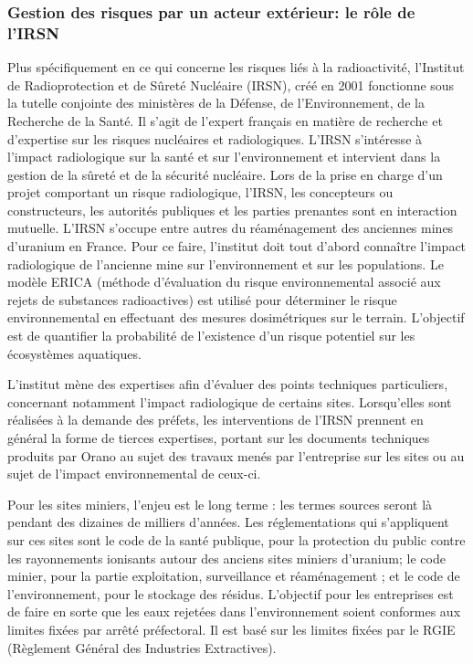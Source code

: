 \documentclass{article}
\begin{document}
\subsubsection{Gestion des risques par un acteur extérieur: le rôle de l’IRSN}

Plus spécifiquement en ce qui concerne les risques liés à la radioactivité, l'Institut de Radioprotection et de Sûreté Nucléaire (IRSN), créé en 2001 fonctionne sous la tutelle conjointe des ministères de la Défense, de l’Environnement, de la Recherche de la Santé. Il s’agit de l’expert français en matière de recherche et d’expertise sur les risques nucléaires et radiologiques. L’IRSN s’intéresse à l’impact radiologique sur la santé et sur l'environnement et intervient dans la gestion de la sûreté et de la sécurité nucléaire. Lors de la prise en charge d’un projet comportant un risque radiologique, l’IRSN, les concepteurs ou constructeurs, les autorités publiques et les parties prenantes sont en interaction mutuelle. L’IRSN s’occupe entre autres du réaménagement des anciennes mines d’uranium en France. Pour ce faire, l’institut doit tout d’abord connaître l’impact radiologique de l’ancienne mine sur l’environnement et sur les populations. Le modèle ERICA (méthode d’évaluation du risque environnemental associé aux rejets de substances radioactives) est utilisé pour déterminer le risque environnemental en effectuant des mesures dosimétriques sur le terrain. L’objectif est de quantifier la probabilité de l’existence d’un risque potentiel sur les écosystèmes aquatiques.

L’institut mène des expertises afin d’évaluer des points techniques particuliers, concernant notamment l’impact radiologique de certains sites. Lorsqu’elles sont réalisées à la demande des préfets, les interventions de l’IRSN prennent en général la forme de tierces expertises, portant sur les documents techniques produits par Orano au sujet des travaux menés par l'entreprise sur les sites ou au sujet de l’impact environnemental de ceux-ci.

Pour les sites miniers, l’enjeu est le long terme : les termes sources seront là pendant des dizaines de milliers d’années. Les réglementations qui s’appliquent sur ces sites sont le code de la santé publique, pour la protection du public contre les rayonnements ionisants autour des anciens sites miniers d’uranium; le code minier, pour la partie exploitation, surveillance et réaménagement ; et le code de l’environnement, pour le stockage des résidus. L’objectif pour les entreprises est de faire en sorte que les eaux rejetées dans l’environnement soient conformes aux limites fixées par arrêté préfectoral. Il est  basé sur les limites fixées par le RGIE (Règlement Général des Industries Extractives).
\end{document}

